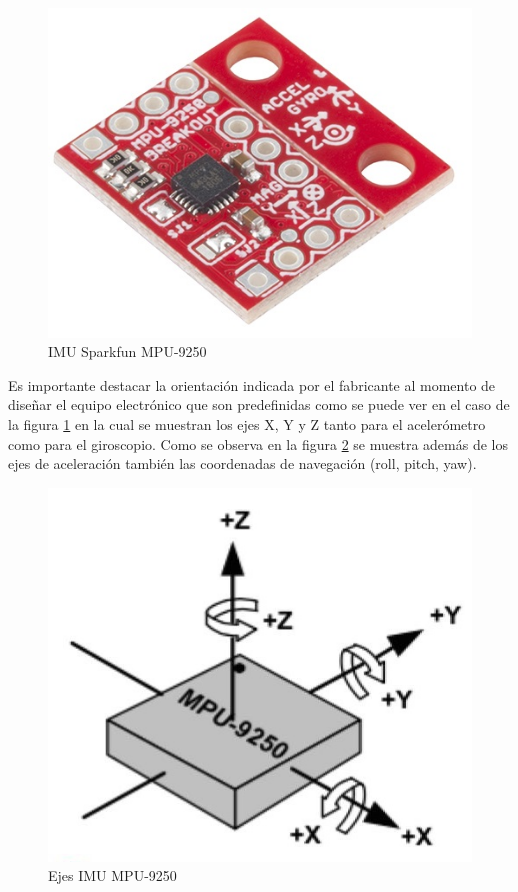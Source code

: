 \begin{figure}[H]
\centering
\includegraphics[scale=1.5]{figuras/sensor/imu/imu1.jpg}
\caption{IMU Sparkfun MPU-9250}
\label{imu1}
\end{figure}

Es importante destacar la orientación indicada por el fabricante al momento de diseñar el equipo electrónico que son predefinidas como se puede ver en el caso de la figura \ref{imu1} en la cual se muestran los ejes X, Y y Z tanto para el acelerómetro como para el giroscopio. 
\newpage
Como se observa en la figura \ref{imu11} se muestra además de los ejes de aceleración también las coordenadas de navegación (roll, pitch, yaw). 

\begin{figure}[H]
\centering
\includegraphics[scale=0.5]{figuras/sensor/imu/imu11.jpg}
\caption{Ejes IMU MPU-9250}
\label{imu11}
\end{figure}

